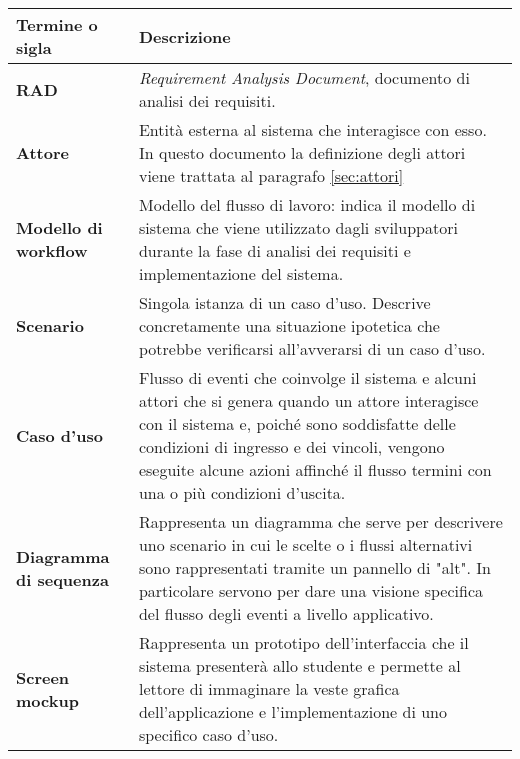 \begin{table}[!h]
\begin{tabular}{p{1.5in}|p{4in}} \\
	{\bf Termine o sigla} & {\bf Descrizione} \\ \hline
	\textbf{RAD} & \textit{Requirement Analysis Document}, documento di analisi dei requisiti. \\
	\textbf{Attore} &  Entità esterna al sistema che interagisce con
	esso. In questo documento la definizione degli attori viene trattata al paragrafo \ref{sec:attori} \\
	\textbf{Modello di workflow} & Modello del flusso di lavoro: indica il modello di sistema che viene utilizzato dagli sviluppatori durante la fase di analisi dei requisiti e implementazione del sistema. \\
	\textbf{Scenario} & Singola istanza di un caso d’uso. Descrive concretamente una situazione ipotetica che potrebbe verificarsi all'avverarsi di un caso d’uso. \\
	\textbf{Caso d'uso} & Flusso di eventi che coinvolge il sistema e alcuni attori che si genera quando  un attore interagisce con il sistema e, poiché sono soddisfatte delle condizioni di ingresso e dei vincoli, vengono eseguite alcune azioni affinché il flusso termini con una o più condizioni d’uscita. \\
	\textbf{Diagramma di sequenza} & Rappresenta un diagramma che serve per descrivere uno scenario in cui le scelte o i flussi alternativi sono rappresentati tramite un pannello di "alt". In particolare servono per dare una visione specifica del flusso degli eventi a livello applicativo. \\
	\textbf{Screen mockup} & Rappresenta un prototipo dell’interfaccia che il sistema presenterà allo studente e permette al lettore di immaginare la veste grafica dell’applicazione e l’implementazione di uno specifico caso d’uso. \\
\end{tabular}
\end{table}
\clearpage